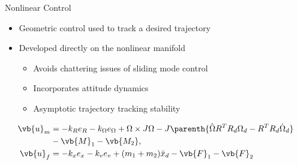 \begin{frame}{Nonlinear Control}
    \begin{itemize}
        \item Geometric control used to track a desired trajectory
        \item Developed directly on the nonlinear manifold
            \begin{itemize}
                \item Avoids chattering issues of sliding mode control
                \item Incorporates attitude dynamics
                \item Asymptotic trajectory tracking stability
            \end{itemize}
    \end{itemize}

\pause
\begin{align*}
    \vb{u}_m &= - k_R e_R - k_\Omega e_\Omega + \Omega \times J \Omega - J \parenth{\hat{\Omega} R^T R_d \Omega_d - R^T R_d \dot{\Omega}_d}  \\
             &- \vb{M}_1 - \vb{M_2} , \\
    \vb{u}_f &= - k_x e_x  - k_v e_v + ( m_1  + m_2 ) \ddot{x}_d - \vb{F}_1 - \vb{F}_2 
\end{align*}
\end{frame}


